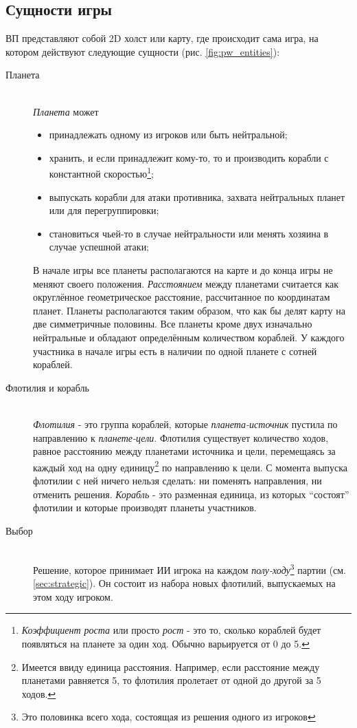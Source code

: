 \documentclass[12pt]{report}
\newenvironment{myItemize}{
	\begin{itemize}
  		\setlength{\itemsep}{1pt}
  		\setlength{\parskip}{0pt}
  		\setlength{\parsep}{0pt}
}{\end{itemize}}
\begin{document}
\subsection{Сущности игры}
ВП представляют собой 2D холст или карту, где происходит сама игра, на котором действуют следующие сущности (рис. \ref{fig:pw_entities}):
\begin{description}
\item[Планета]\hfill \\
	\emph{Планета} может
	\begin{myItemize}
	\item принадлежать одному из игроков или быть нейтральной;
	\item хранить, и если принадлежит кому-то, то и производить корабли с константной скоростью\footnote{\emph{Коэффициент роста} или просто \emph{рост} - это то, сколько кораблей будет появляться на планете за один ход. Обычно варьируется от 0 до 5.};
	\item выпускать корабли для атаки противника, захвата нейтральных планет или для перегруппировки;
	\item становиться чьей-то в случае нейтральности или менять хозяина в случае успешной атаки;	 
	\end{myItemize}
В начале игры все планеты располагаются на карте и до конца игры не меняют своего положения. \emph{Расстоянием} между планетами считается как округлённое геометрическое расстояние, рассчитанное по координатам планет. Планеты располагаются таким образом, что как бы делят карту на две симметричные половины. Все планеты кроме двух изначально нейтральные и обладают определённым количеством кораблей. У каждого участника в начале игры есть в наличии по одной планете с сотней кораблей.
\item[Флотилия и корабль]\hfill \\
\emph{Флотилия} - это группа кораблей, которые \emph{планета-источник} пустила по направлению к \emph{планете-цели}. Флотилия существует количество ходов, равное расстоянию между планетами источника и цели, перемещаясь за каждый ход на одну единицу\footnote{Имеется ввиду единица расстояния. Например, если расстояние между планетами равняется 5, то флотилия пролетает от одной до другой за 5 ходов.} по направлению к цели. С момента выпуска флотилии с ней ничего нельзя сделать: ни поменять направления, ни отменить решения. \emph{Корабль} - это разменная единица, из которых ``состоят'' флотилии и которые производят планеты участников.
\item[Выбор]\hfill \\
Решение, которое принимает ИИ игрока на каждом \emph{полу-ходу}\footnote{Это половинка всего хода, состоящая из решения одного из игроков} партии (см. \ref{sec:strategic}). Он состоит из набора новых флотилий, выпускаемых на этом ходу игроком.
\end{description}
\end{document}
